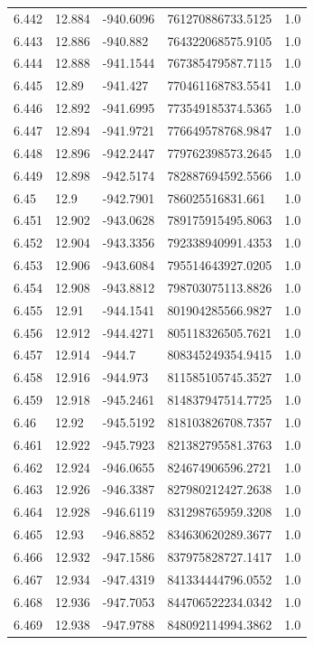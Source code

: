 \begin{tabular}{lllll}
6.442 & 12.884 & -940.6096 & 761270886733.5125 & 1.0 \\
6.443 & 12.886 & -940.882 & 764322068575.9105 & 1.0 \\
6.444 & 12.888 & -941.1544 & 767385479587.7115 & 1.0 \\
6.445 & 12.89 & -941.427 & 770461168783.5541 & 1.0 \\
6.446 & 12.892 & -941.6995 & 773549185374.5365 & 1.0 \\
6.447 & 12.894 & -941.9721 & 776649578768.9847 & 1.0 \\
6.448 & 12.896 & -942.2447 & 779762398573.2645 & 1.0 \\
6.449 & 12.898 & -942.5174 & 782887694592.5566 & 1.0 \\
6.45 & 12.9 & -942.7901 & 786025516831.661 & 1.0 \\
6.451 & 12.902 & -943.0628 & 789175915495.8063 & 1.0 \\
6.452 & 12.904 & -943.3356 & 792338940991.4353 & 1.0 \\
6.453 & 12.906 & -943.6084 & 795514643927.0205 & 1.0 \\
6.454 & 12.908 & -943.8812 & 798703075113.8826 & 1.0 \\
6.455 & 12.91 & -944.1541 & 801904285566.9827 & 1.0 \\
6.456 & 12.912 & -944.4271 & 805118326505.7621 & 1.0 \\
6.457 & 12.914 & -944.7 & 808345249354.9415 & 1.0 \\
6.458 & 12.916 & -944.973 & 811585105745.3527 & 1.0 \\
6.459 & 12.918 & -945.2461 & 814837947514.7725 & 1.0 \\
6.46 & 12.92 & -945.5192 & 818103826708.7357 & 1.0 \\
6.461 & 12.922 & -945.7923 & 821382795581.3763 & 1.0 \\
6.462 & 12.924 & -946.0655 & 824674906596.2721 & 1.0 \\
6.463 & 12.926 & -946.3387 & 827980212427.2638 & 1.0 \\
6.464 & 12.928 & -946.6119 & 831298765959.3208 & 1.0 \\
6.465 & 12.93 & -946.8852 & 834630620289.3677 & 1.0 \\
6.466 & 12.932 & -947.1586 & 837975828727.1417 & 1.0 \\
6.467 & 12.934 & -947.4319 & 841334444796.0552 & 1.0 \\
6.468 & 12.936 & -947.7053 & 844706522234.0342 & 1.0 \\
6.469 & 12.938 & -947.9788 & 848092114994.3862 & 1.0 \\

\end{tabular}
